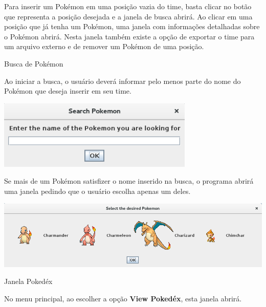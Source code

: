 \documentclass[
	article,			%
	12pt,				%
	oneside,			%
	a4paper,			%
	english,			%
	brazil,				%
	sumario=tradicional
	]{abntex2}
\begin{document}
Para inserir um Pokémon em uma posição vazia do time, basta clicar no botão que representa a posição desejada e a janela de busca abrirá.
Ao clicar em uma posição que já tenha um Pokémon, uma janela com informações detalhadas sobre o Pokémon abrirá.
Nesta janela também existe a opção de exportar o time para um arquivo externo e de remover um Pokémon de uma posição.

\newpage
\begin{center}
{\Large Busca de Pokémon}
\end{center}

Ao iniciar a busca, o usuário deverá informar pelo menos parte do nome do Pokémon que deseja inserir em seu time.

\begin{center}
\includegraphics[width=0.7\textwidth]{search_prompt}\par
\end{center}

Se mais de um Pokémon satisfizer o nome inserido na busca, o programa abrirá uma janela pedindo que o usuário escolha apenas um deles.

\begin{center}
\includegraphics[width=1\textwidth]{search_results}\par
\end{center}

\newpage
\begin{center}
{\Large Janela Pokedéx}
\end{center}

No menu principal, ao escolher a opção {\bfseries View Pokedéx}, esta janela abrirá.
\end{document}

